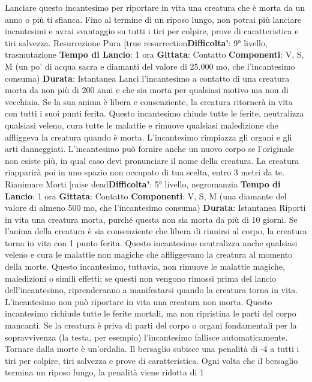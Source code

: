 \begin{multicols}{2}
Lanciare questo incantesimo per riportare in vita una
creatura che è morta da un anno o più ti sfianca. Fino al
termine di un riposo lungo, non potrai più lanciare
incantesimi e avrai svantaggio su tutti i tiri per colpire,
prove di caratteristica e tiri salvezza.
Resurrezione Pura
[true resurrection\textbf{Difficolta'}:
9° livello, trasmutazione
\textbf{Tempo di Lancio}: 1 ora
\textbf{Gittata}: Contatto
\textbf{Componenti}: V, S, M (un po’ di acqua sacra e diamanti
del valore di 25.000 mo, che l’incantesimo consuma)
\textbf{Durata}: Istantanea
Lanci l’incantesimo a contatto di una creatura morta da
non più di 200 anni e che sia morta per qualsiasi motivo
ma non di vecchiaia. Se la sua anima è libera e
consenziente, la creatura ritornerà in vita con tutti i suoi
punti ferita.
Questo incantesimo chiude tutte le ferite, neutralizza
qualsiasi veleno, cura tutte le malattie e rimuove
qualsiasi maledizione che affliggeva la creatura quando
è morta. L’incantesimo rimpiazza gli organi e gli arti
danneggiati.
L’incantesimo può fornire anche un nuovo corpo se
l’originale non esiste più, in qual caso devi pronunciare
il nome della creatura. La creatura riapparirà poi in uno
spazio non occupato di tua scelta, entro 3 metri da te.
Rianimare Morti
[raise dead\textbf{Difficolta'}:
5° livello, negromanzia
\textbf{Tempo di Lancio}: 1 ora
\textbf{Gittata}: Contatto
\textbf{Componenti}: V, S, M (una diamante del valore di
almeno 500 mo, che l’incantesimo consuma)
\textbf{Durata}: Istantanea
Riporti in vita una creatura morta, purché questa non
sia morta da più di 10 giorni. Se l’anima della creatura è
sia consenziente che libera di riunirsi al corpo, la
creatura torna in vita con 1 punto ferita.
Questo incantesimo neutralizza anche qualsiasi veleno
e cura le malattie non magiche che affliggevano la
creatura al momento della morte. Questo incantesimo,
tuttavia, non rimuove le malattie magiche, maledizioni o
simili effetti; se questi non vengono rimossi prima del
lancio dell’incantesimo, riprenderanno a manifestarsi
quando la creatura torna in vita. L’incantesimo non può
riportare in vita una creatura non morta.
Questo incantesimo richiude tutte le ferite mortali, ma
non ripristina le parti del corpo mancanti. Se la creatura
è priva di parti del corpo o organi fondamentali per la
sopravvivenza (la testa, per esempio) l’incantesimo
fallisce automaticamente.
Tornare dalla morte è un’ordalia. Il bersaglio subisce
una penalità di -4 a tutti i tiri per colpire, tiri salvezza e
prove di caratteristica. Ogni volta che il bersaglio
termina un riposo lungo, la penalità viene ridotta di 1

\end{multicols}
